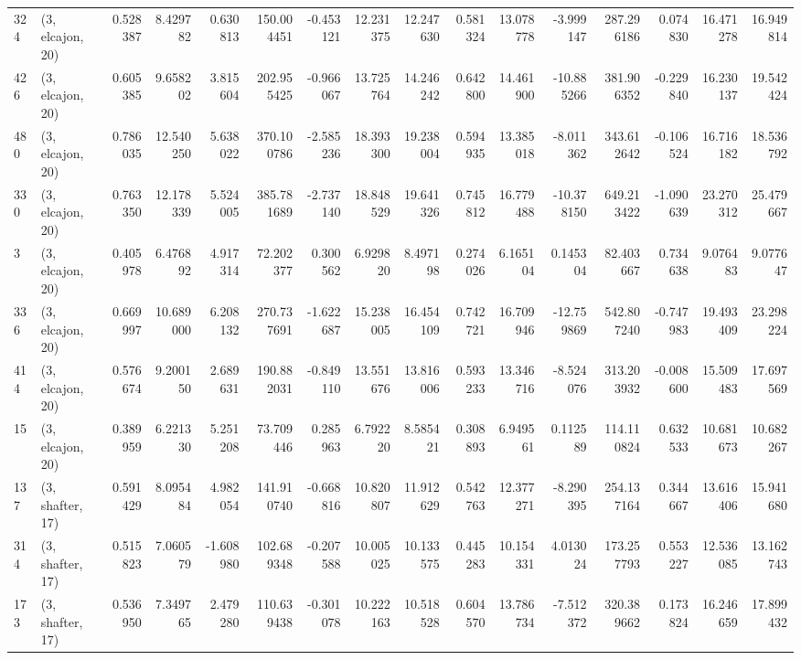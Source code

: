 \begin{tabular}{llrrrrrrrrrrrrrr}
324 &  (3, elcajon, 20) &   0.528387 &   8.429782 &   0.630813 &   150.004451 &  -0.453121 &  12.231375 &  12.247630 &  0.581324 &  13.078778 &  -3.999147 &    287.296186 &    0.074830 &   16.471278 &   16.949814 \\
426 &  (3, elcajon, 20) &   0.605385 &   9.658202 &   3.815604 &   202.955425 &  -0.966067 &  13.725764 &  14.246242 &  0.642800 &  14.461900 & -10.885266 &    381.906352 &   -0.229840 &   16.230137 &   19.542424 \\
480 &  (3, elcajon, 20) &   0.786035 &  12.540250 &   5.638022 &   370.100786 &  -2.585236 &  18.393300 &  19.238004 &  0.594935 &  13.385018 &  -8.011362 &    343.612642 &   -0.106524 &   16.716182 &   18.536792 \\
330 &  (3, elcajon, 20) &   0.763350 &  12.178339 &   5.524005 &   385.781689 &  -2.737140 &  18.848529 &  19.641326 &  0.745812 &  16.779488 & -10.378150 &    649.213422 &   -1.090639 &   23.270312 &   25.479667 \\
3   &  (3, elcajon, 20) &   0.405978 &   6.476892 &   4.917314 &    72.202377 &   0.300562 &   6.929820 &   8.497198 &  0.274026 &   6.165104 &   0.145304 &     82.403667 &    0.734638 &    9.076483 &    9.077647 \\
336 &  (3, elcajon, 20) &   0.669997 &  10.689000 &   6.208132 &   270.737691 &  -1.622687 &  15.238005 &  16.454109 &  0.742721 &  16.709946 & -12.759869 &    542.807240 &   -0.747983 &   19.493409 &   23.298224 \\
414 &  (3, elcajon, 20) &   0.576674 &   9.200150 &   2.689631 &   190.882031 &  -0.849110 &  13.551676 &  13.816006 &  0.593233 &  13.346716 &  -8.524076 &    313.203932 &   -0.008600 &   15.509483 &   17.697569 \\
15  &  (3, elcajon, 20) &   0.389959 &   6.221330 &   5.251208 &    73.709446 &   0.285963 &   6.792220 &   8.585421 &  0.308893 &   6.949561 &   0.112589 &    114.110824 &    0.632533 &   10.681673 &   10.682267 \\
137 &  (3, shafter, 17) &   0.591429 &   8.095484 &   4.982054 &   141.910740 &  -0.668816 &  10.820807 &  11.912629 &  0.542763 &  12.377271 &  -8.290395 &    254.137164 &    0.344667 &   13.616406 &   15.941680 \\
314 &  (3, shafter, 17) &   0.515823 &   7.060579 &  -1.608980 &   102.689348 &  -0.207588 &  10.005025 &  10.133575 &  0.445283 &  10.154331 &   4.013024 &    173.257793 &    0.553227 &   12.536085 &   13.162743 \\
173 &  (3, shafter, 17) &   0.536950 &   7.349765 &   2.479280 &   110.639438 &  -0.301078 &  10.222163 &  10.518528 &  0.604570 &  13.786734 &  -7.512372 &    320.389662 &    0.173824 &   16.246659 &   17.899432 \\

\end{tabular}
